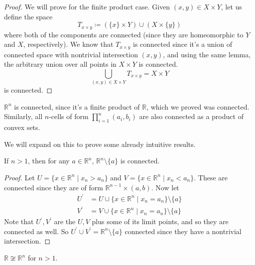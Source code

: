   \begin{proof}
    We will prove for the finite product case. Given $(x, y) \in X \times Y$, let us define the space 
    \begin{equation}
      T_{x \times y} \coloneqq (\{x\} \times Y) \cup (X \times \{y\})
    \end{equation}
    where both of the components are connected (since they are homeomorphic to $Y$ and $X$, respectively). We know that $T_{x \times y}$ is connected since it's a union of connected space with nontrivial intersection $(x, y)$, and using the same lemma, the arbitrary union over all points in $X \times Y$ is connected. 
    \begin{equation}
      \bigcup_{(x, y) \in X \times Y} T_{x \times y} = X \times Y
    \end{equation}
    is connected. 
  \end{proof}

  \begin{example}
    $\mathbb{R}^n$ is connected, since it's a finite product of $\mathbb{R}$, which we proved was connected. Similarly, all $n$-cells of form $\prod_{i=1}^n (a_i, b_i)$ are also connected as a product of convex sets. 
  \end{example} 

  We will expand on this to prove some already intuitive results. 

  \begin{theorem}
    If $n > 1$, then for any $a \in \mathbb{R}^n$, $\mathbb{R}^n \setminus \{a\}$ is connected. 
  \end{theorem}
  \begin{proof}
    Let $U = \{x \in \mathbb{R}^n \mid x_n > a_n\}$ and $V = \{x \in \mathbb{R}^n \mid x_n < a_n\}$. These are connected since they are of form $\mathbb{R}^{n-1} \times (a, b)$. Now let 
    \begin{align}
      U^\prime & = U \cup \{x \in \mathbb{R}^n \mid x_n = a_n\} \setminus \{a\} \\
      V^\prime & = V \cup \{x \in \mathbb{R}^n \mid x_n = a_n\} \setminus \{a\} 
    \end{align}
    Note that $U^\prime, V^\prime$ are the $U, V$ plus some of its limit points, and so they are connected as well. So $U^\prime \cup V^\prime = \mathbb{R}^n \setminus \{a\}$ connected since they have a nontrivial intersection. 
  \end{proof}

  \begin{corollary}
    $\mathbb{R} \not\cong \mathbb{R}^n$ for $n > 1$. 
  \end{corollary}

